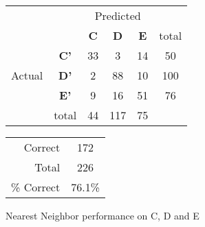 \begin{figure}[ht]
\begin{minipage}[b]{0.5\linewidth}
\centering
	\begin{tabular}{ccc|c|c|c}
	 & &\multicolumn{3}{c}{Predicted} &\\
	  & & \bf{C} &  \bf{D} & \bf{E} & total \\
	 \cline{3-5}
	 \multirow{3}{*}{\begin{sideways}Actual\end{sideways}} & \bf{C'}& 33 & 3 & 14 & 50\\
	 \cline{3-6}
	 & \bf{D'}& 2 & 88 & 10 & 100\\
	  \cline{3-6}
	 & \bf{E'}& 9 & 16 & 51 &  76\\
	  \cline{3-6}
	 &total&44&117&75\\
	\end{tabular}
\end{minipage}
\hspace{0.5cm}
\begin{minipage}[b]{0.5\linewidth}
	\begin{tabular}{r|c}
	\hline
	Correct& 172\\
	Total& 226\\
	\hline
	\% Correct& 76.1\%\\
	\hline
	\end{tabular}
\end{minipage}
\vspace{1mm}
\caption{Nearest Neighbor performance on C, D and E}
\end{figure}




